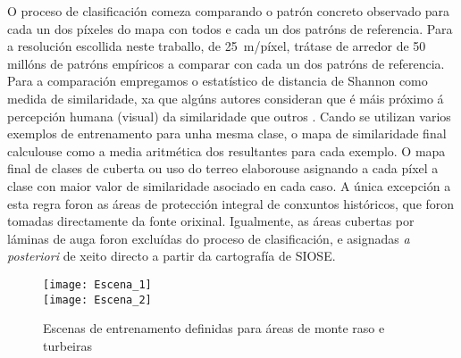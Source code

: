 \documentclass[11pt,a4paper]{article}
\begin{document}
O proceso de clasificación comeza comparando o patrón concreto observado para cada un dos píxeles do mapa con todos e cada un dos patróns de referencia. Para a resolución escollida neste traballo, de 25~m/píxel, trátase de arredor de 50 millóns de patróns empíricos a comparar con cada un dos patróns de referencia. Para a comparación empregamos o estatístico de distancia de Shannon \citep{Cha2007} como medida de similaridade, xa que algúns autores consideran que é máis próximo á percepción humana (visual) da similaridade que outros \citep{Jasiewicz2014104}. Cando se utilizan varios exemplos de entrenamento para unha mesma clase, o mapa de similaridade final calculouse como a media aritmética dos resultantes para cada exemplo. O mapa final de clases de cuberta ou uso do terreo elaborouse asignando a cada píxel a clase con maior valor de similaridade asociado en cada caso. A única excepción a esta regra foron as áreas de protección integral de conxuntos históricos, que foron tomadas directamente da fonte orixinal. Igualmente, as áreas cubertas por láminas de auga foron excluídas do proceso de clasificación, e asignadas \emph{a posteriori} de xeito directo a partir da cartografía de SIOSE.


\begin{figure}
\caption{Escenas de entrenamento definidas para áreas de monte raso e turbeiras}\label{fig:escenas1}
\texttt{[image: Escena\_1]}\\
\texttt{[image: Escena\_2]}
\end{figure}
\end{document}
